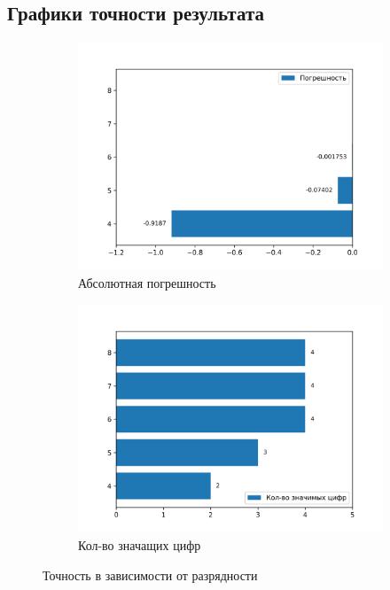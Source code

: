 \documentclass[a4paper,12pt]{article}
\begin{document}
\subsection{Графики точности результата}
\begin{figure}[H]
\centering
\begin{subfigure}{.5\textwidth}
  \centering
  \includegraphics[width=\linewidth]{plots/series_fixed_error.png}
  \caption{Абсолютная погрешность}
  \label{fig:sub3}
\end{subfigure}%
\begin{subfigure}{.5\textwidth}
  \centering
  \includegraphics[width=\linewidth]{plots/series_fixed_n_digits.png}
  \caption{Кол-во значащих цифр}
  \label{fig:sub4}
\end{subfigure}
\caption{Точность в зависимости от разрядности}
\label{fig:test}
\end{figure}
\end{document}
